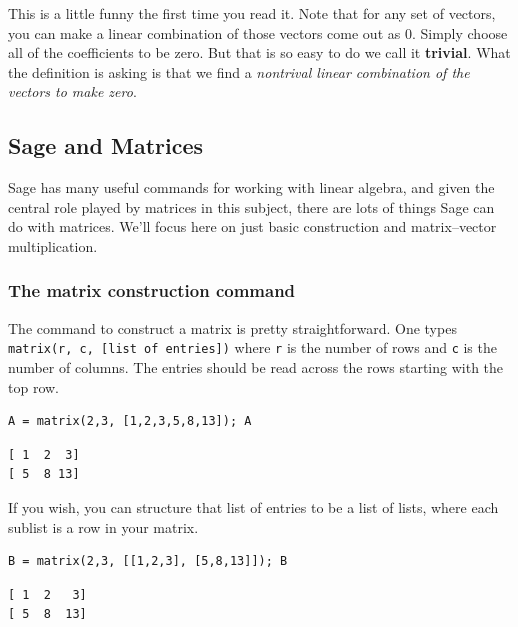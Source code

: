 \documentclass[10pt,]{book}
\newcommand{\terminology}[1]{\textbf{#1}}
\theoremstyle{plain}
\numberwithin{equation}{section}
\begin{document}
        This is a little funny the first time you read it. Note that for any
        set of vectors, you can make a linear combination of those vectors
        come out as \(0\). Simply choose all of the coefficients to be
        zero. But that is so easy to do we call it \terminology{trivial}. What the
        definition is asking is that we find a \emph{nontrival linear
        combination of the vectors to make zero}.
\typeout{************************************************}
\typeout{************************************************}
\subsection[Sage and Matrices]{Sage and Matrices}\label{subsection-13}

      Sage has many useful commands for working with linear algebra, and
      given the central role played by matrices in this subject, there are
      lots of things Sage can do with matrices. We'll focus here on just basic
      construction and matrix--vector multiplication.
\typeout{************************************************}
\typeout{************************************************}
\subsubsection[The matrix construction command]{The matrix construction command}\label{subsubsection-7}
The command to construct a matrix is pretty straightforward. One types
        \verb?matrix(r, c, [list of entries])? where \verb?r? is
        the number of rows and \verb?c? is the number of columns. The entries
        should be read across the rows starting with the top row.
\begin{lstlisting}[style=sageinput]
A = matrix(2,3, [1,2,3,5,8,13]); A
\end{lstlisting}
\begin{lstlisting}[style=sageoutput]
[ 1  2  3]
[ 5  8 13]
\end{lstlisting}
\par
If you wish, you can structure that list of entries to be a list of lists,
        where each sublist is a row in your matrix.
\begin{lstlisting}[style=sageinput]
B = matrix(2,3, [[1,2,3], [5,8,13]]); B
\end{lstlisting}
\begin{lstlisting}[style=sageoutput]
[ 1  2   3]
[ 5  8  13]
\end{lstlisting}
\par
\end{document}
